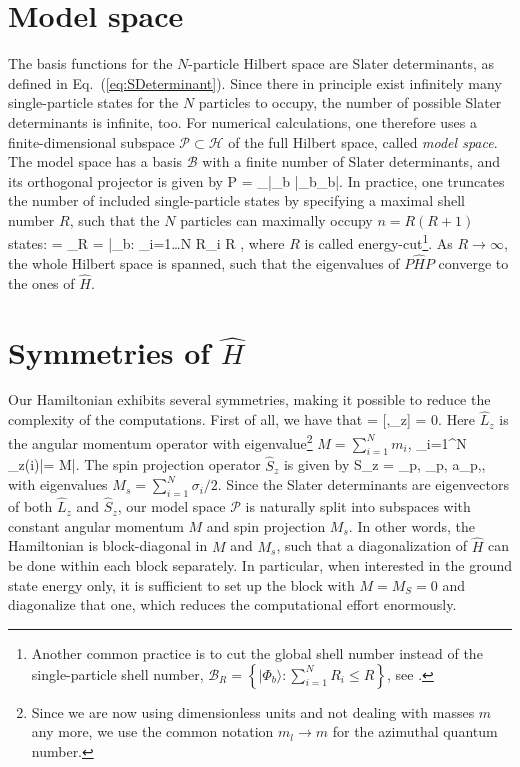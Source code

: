 \section{Model space}
The basis functions for the $N$-particle Hilbert space are Slater determinants, as defined in \mbox{Eq. (\ref{eq:SDeterminant})}. Since there in principle exist infinitely many single-particle states  for the $N$ particles to occupy, the number of possible Slater determinants is infinite, too. For numerical calculations, one therefore uses a finite-dimensional subspace $\mathcal{P}\subset \mathcal{H}$ of the full Hilbert space, called \textit{model space}. The model space has a basis $\mathcal{B}$ with a finite number of Slater determinants, and its orthogonal projector is given by
\be 
P = \sum_{|\Phi_b\rangle \in {}} |\Phi_b\rangle\langle\Phi_b|.
\ee
In practice, one truncates the number of included single-particle states by specifying a maximal shell number $R$, such that the $N$ particles can maximally occupy $n= R(R+1)$ states:
\be 
{} = _R = \left\lbrace |\Phi_b\rangle : \max_{i=1\dots N} R_i \leq R \right\rbrace,
\ee
where $R$ is called energy-cut\footnote{Another common practice is to cut the global shell number instead of the single-particle shell number, \mbox{$\mathcal{B}_R = \left\lbrace |\Phi_b\rangle : \sum_{i=1}^N R_i \leq R \right\rbrace$}, see \cite{PhysRevB.80.045321}.}. As $R\rightarrow\infty$, the whole Hilbert space is spanned, such that the eigenvalues of $P\hat{H}P$ converge to the ones of $\hat{H}$. 

\section{Symmetries of $\hat{H}$}
Our Hamiltonian exhibits several symmetries, making it possible to reduce the complexity of the computations.  First of all, we have that 
 = [,_z] = 0.
\label{eq:commut}
\ee 
Here $\hat{L}_z$ is the angular momentum operator with eigenvalue\footnote{Since we are now using dimensionless units and not dealing with masses $m$ any more, we use the common notation $m_l\rightarrow m$ for the azimuthal quantum number.} $M = \sum_{i=1}^N m_{i}$,
\be 
\sum_{i=1}^N _z(i)|\Phi\rangle = M|\Phi\rangle.
\ee
The spin projection operator $\hat{S}_z$ is given by
\be 
S_z = \sum_{p,\sigma} \sigma \ad_{p,\sigma} a_{p,\sigma},
\ee
with eigenvalues $M_s = \sum_{i=1}^N \sigma_i/2$. Since the Slater determinants are eigenvectors of both $\hat{L}_z$ and $\hat{S}_z$, our model space $\mathcal{P}$ is naturally split into subspaces with constant angular momentum $M$ and spin projection $M_s$. In other words, the Hamiltonian is block-diagonal in $M$ and $M_s$, such that a diagonalization of $\hat{H}$ can be done within each block separately. In particular, when interested in the ground state energy only, it is sufficient to set up the block with $M=M_S = 0$ and diagonalize that one, which reduces the computational effort enormously.

